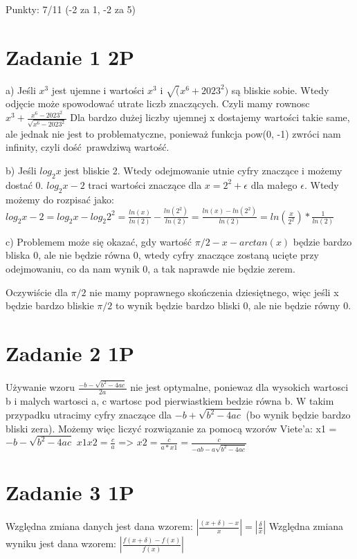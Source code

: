 \documentclass[12pt]{article}
\begin{document}
\bgroup\obeylines
Punkty: 7/11     (-2 za 1, -2 za 5)

\section{Zadanie 1 2P}
a) Jeśli $x^3$ jest ujemne i wartości $x^3$ i $\sqrt(x^6 + 2023^2)$ są bliskie sobie. Wtedy odjęcie może spowodować utrate liczb znaczących.
Czyli mamy rownosc 
$x^3 + \frac{x^6-2023^2}{\sqrt{x^6-2023^2}}$
Dla bardzo dużej liczby ujemnej x dostajemy wartości takie same, ale jednak nie jest to problematyczne, ponieważ funkcja pow(0, -1) zwróci nam infinity, czyli dość prawdziwą wartość.


b) Jeśli $log_2{x}$ jest bliskie 2. Wtedy odejmowanie utnie cyfry znaczące i możemy dostać 0.
$log_2{x} - 2$ traci wartości znaczące dla $x = 2^2 + \epsilon$ dla małego $\epsilon$.
Wtedy możemy do rozpisać jako:
$log_2{x} - 2 = log_2{x} - log_2{2^2} = \frac{ln(x)}{ln(2)} - \frac{ln(2^2)}{ln(2)} = \frac{ln(x)-ln(2^2)}{ln(2)} = ln(\frac{x}{2^2}) * \frac{1}{ln(2)}$

c) Problemem może się okazać, gdy wartość $\pi / 2 - x - arctan(x)$ będzie bardzo bliska 0, ale nie będzie równa 0, wtedy cyfry znaczące zostaną ucięte przy odejmowaniu, co da nam wynik 0, a tak naprawde nie będzie zerem. 

Oczywiście dla $\pi / 2$ nie mamy poprawnego skończenia dziesiętnego, więc jeśli x będzie bardzo bliskie $\pi / 2$ to wynik będzie bardzo bliski 0, ale nie będzie równy 0.




\section{Zadanie 2 1P}
Używanie wzoru $\frac{-b - \sqrt{b^2-4ac}}{2a}$ nie jest optymalne, poniewaz dla wysokich wartosci b i malych wartosci a, c wartosc pod pierwiastkiem bedzie równa b. W takim przypadku utracimy cyfry znaczące dla $-b + \sqrt{b^2-4ac}$ (bo wynik będzie bardzo bliski zera). Możemy więc liczyć rozwiązanie za pomocą wzorów Viete'a:
x1 = $-b - \sqrt{b^2-4ac}$
$x1x2 = \frac{c}{a}$ => $x2 = \frac{c}{a*x1} = \frac{c}{-ab - a \sqrt{b^2-4ac}}$

\section{Zadanie 3 1P}
Względna zmiana danych jest dana wzorem:
$|\frac{(x+\delta) - x}{x}| = |\frac{\delta}{x}|$
Względna zmiana wyniku jest dana wzorem:
$|\frac{f(x+\delta)-f(x)}{f(x)}|$
\end{document}
